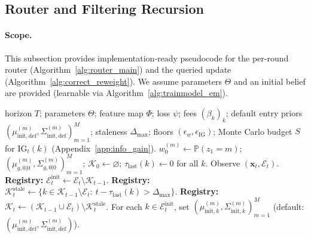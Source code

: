 \subsection{Router and Filtering Recursion}
\label{app:alg_router}
\paragraph{Scope.} This subsection provides implementation-ready pseudocode for the per-round router
(Algorithm~\ref{alg:router_main}) and the queried update (Algorithm~\ref{alg:correct_reweight}). We
assume parameters \(\Theta\) and an initial belief are provided (learnable via Algorithm~\ref{alg:trainmodel_em}).

\begin{algorithm}[H]
\caption{Context-Aware Router L2D-SLDS}
\label{alg:router_main}
\begin{algorithmic}[1]
 horizon \(T\); parameters \(\Theta\); feature map \(\Phi\); loss \(\psi\); fees \((\beta_k)_k\); default entry priors \((\mu^{(m)}_{\mathrm{init,def}},\Sigma^{(m)}_{\mathrm{init,def}})_{m=1}^M\); staleness \(\Delta_{\max}\); floors \((\epsilon_w,\epsilon_{\mathrm{IG}})\); Monte Carlo budget \(S\) for \(\mathrm{IG}_t(k)\) (Appendix~\ref{app:info_gain}).
 \(w_0^{(m)}\leftarrow \mathbb{P}(z_1=m)\); \((\mu^{(m)}_{g,0|0},\Sigma^{(m)}_{g,0|0})_{m=1}^M\); \(\mathcal{K}_0\leftarrow\varnothing\); \(\tau_{\mathrm{last}}(k)\leftarrow 0\) for all \(k\).
    \STATE Observe \((\mathbf{x}_t,\mathcal{E}_t)\).
    \STATE \textbf{Registry:} \(\mathcal{E}^{\mathrm{init}}_t \leftarrow \mathcal{E}_t \setminus \mathcal{K}_{t-1}\).
    \STATE \textbf{Registry:} \(\mathcal{K}^{\mathrm{stale}}_t \leftarrow \{k\in\mathcal{K}_{t-1}\setminus\mathcal{E}_t:\ t-\tau_{\mathrm{last}}(k)>\Delta_{\max}\}\).
    \STATE \textbf{Registry:} \(\mathcal{K}_t \leftarrow (\mathcal{K}_{t-1}\cup \mathcal{E}_t)\setminus \mathcal{K}^{\mathrm{stale}}_t\). 
    \STATE For each \(k\in\mathcal{E}^{\mathrm{init}}_t\), set \((\mu^{(m)}_{\mathrm{init},k},\Sigma^{(m)}_{\mathrm{init},k})_{m=1}^M\) (default: \((\mu^{(m)}_{\mathrm{init,def}},\Sigma^{(m)}_{\mathrm{init,def}})\)).

    \STATE {}
    \STATE
{}


\end{algorithmic}
\end{algorithm}
